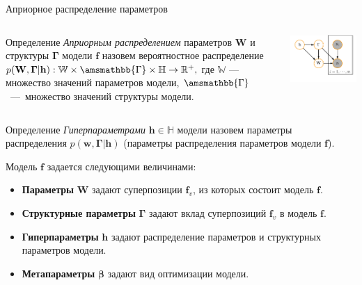 \documentclass[usenames,dvipsnames,11pt,pdf,utf8,russian,aspectratio=43]{beamer}
\begin{document}
\begin{frame}{Априорное распределение параметров}
\footnotesize   
\begin{columns}
\begin{column}{0.6\textwidth}
   \begin{block}{Определение}
\textit{Априорным распределением} параметров $\mathbf{W}$ и структуры  $\boldsymbol{\Gamma}$ модели $\mathbf{f}$ назовем вероятностное распределение
$
    p(\mathbf{W}, \boldsymbol{\Gamma}|\mathbf{h}): \mathbb{W} \times \amsmathbb{\Gamma} \times \mathbb{H} \to \mathbb{R}^{+}, 
$
где $\mathbb{W}$ --- множество значений параметров модели, $\amsmathbb{\Gamma}$~---~множество значений структуры модели.
\end{block}

\end{column}
\begin{column}{0.4\textwidth}  %
    \begin{center}
     \includegraphics[width=\textwidth]{simple_plate.pdf}
     \end{center}
\end{column}
\end{columns}
\vspace*{-0.5cm}
\begin{block}{Определение}
\textit{Гиперпараметрами} $\mathbf{h}\in \mathbb{H}$ модели  назовем параметры распределения $p(\mathbf{w}, \boldsymbol{\Gamma}|\mathbf{h})$ (параметры распределения параметров модели $\mathbf{f}$).
 
\end{block}
Модель $\mathbf{f}$ задается следующими величинами:
\begin{itemize}
\item \textbf{Параметры} $\mathbf{W}$ задают суперпозиции $\mathbf{f}_v$, из которых состоит модель $\mathbf{f}$.
\item \textbf{Структурные параметры} $\boldsymbol{\Gamma}$ задают вклад суперпозиций $\mathbf{f}_v$ в модель $\mathbf{f}$.
\item \textbf{Гиперпараметры} $\mathbf{h}$ задают распределение параметров и структурных параметров модели.
\item \textbf{Метапараметры} $\boldsymbol{\beta}$ задают вид оптимизации модели.
\end{itemize}


\end{frame}
\end{document}
